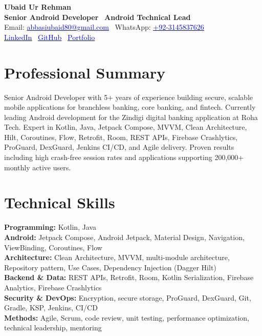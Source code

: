 \documentclass[11pt,letterpaper]{article}
\newcommand{\cvlink}[2]{\href{#1}{\textcolor{blue}{\underline{#2}}}}
\begin{document}
\begin{center}
{\LARGE \textbf{Ubaid Ur Rehman}}\\[6pt]
\textbf{Senior Android Developer} \textbar\ \textbf{Android Technical Lead}\\[4pt]
Email: \cvlink{mailto:abbasiubaid80@gmail.com}{abbasiubaid80@gmail.com} \textbar\
WhatsApp: \cvlink{https://wa.me/923145837626}{+92-3145837626}\\[6pt]
\cvlink{https://www.linkedin.com/in/ubaid-ur-rehman-27645a140}{LinkedIn} \textbar\
\cvlink{https://github.com/UbaidUrRehman583}{GitHub} \textbar\
\cvlink{https://ubaidurrehman583.github.io/My-Portfolio/}{Portfolio}
\end{center}

\section*{Professional Summary}
Senior Android Developer with 5+ years of experience building secure, scalable mobile applications for branchless banking, core banking, and fintech. Currently leading Android development for the Zindigi digital banking application at Roha Tech. Expert in Kotlin, Java, Jetpack Compose, MVVM, Clean Architecture, Hilt, Coroutines, Flow, Retrofit, Room, REST APIs, Firebase Crashlytics, ProGuard, DexGuard, Jenkins CI/CD, and Agile delivery. Proven results including high crash-free session rates and applications supporting 200,000+ monthly active users.

\section*{Technical Skills}
\textbf{Programming:} Kotlin, Java\\
\textbf{Android:} Jetpack Compose, Android Jetpack, Material Design, Navigation, ViewBinding, Coroutines, Flow\\
\textbf{Architecture:} Clean Architecture, MVVM, multi-module architecture, Repository pattern, Use Cases, Dependency Injection (Dagger Hilt)\\
\textbf{Backend \& Data:} REST APIs, Retrofit, Room, Kotlin Serialization, Firebase Analytics, Firebase Crashlytics\\
\textbf{Security \& DevOps:} Encryption, secure storage, ProGuard, DexGuard, Git, Gradle, KSP, Jenkins, CI/CD\\
\textbf{Methods:} Agile, Scrum, code review, unit testing, performance optimization, technical leadership, mentoring
\end{document}
